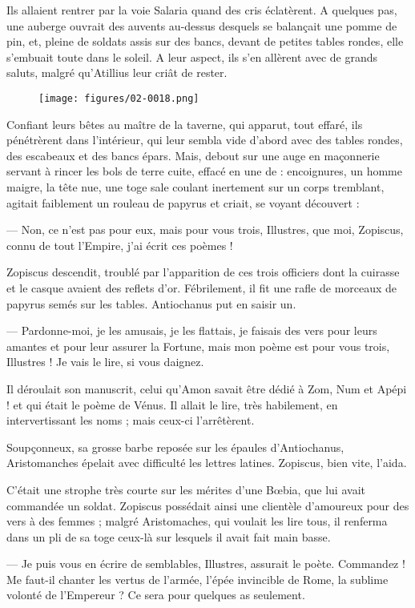 \documentclass[a4paper, 11pt, oneside, polutonikogreek, french]{article}
\begin{document}
Ils allaient rentrer par la voie Salaria quand des cris éclatèrent. A quelques pas, une auberge ouvrait des auvents au-dessus desquels se balançait une pomme de pin, et, pleine de soldats assis sur des bancs, devant de petites tables rondes, elle s'embuait toute dans le soleil. A leur aspect, ils s'en allèrent avec de grands saluts, malgré qu'Atillius leur criât de rester.
\begin{figure}[H]
\centering
\texttt{[image: figures/02-0018.png]}
\end{figure}
Confiant leurs bêtes au maître de la taverne, qui apparut, tout effaré, ils pénétrèrent dans l'intérieur, qui leur sembla vide d'abord avec des tables rondes, des escabeaux et des bancs épars. Mais, debout sur une auge en maçonnerie servant à rincer les bols de terre cuite, effacé en une de : encoignures, un homme maigre, la tête nue, une toge sale coulant inertement sur un corps tremblant, agitait faiblement un rouleau de papyrus et criait, se voyant découvert :

--- Non, ce n'est pas pour eux, mais pour vous trois, Illustres, que moi, Zopiscus, connu de tout l'Empire, j'ai écrit ces poèmes !

Zopiscus descendit, troublé par l'apparition de ces trois officiers dont la cuirasse et le casque avaient des reflets d'or. Fébrilement, il fit une rafle de morceaux de papyrus semés sur les tables. Antiochanus put en saisir un.

--- Pardonne-moi, je les amusais, je les flattais, je faisais des vers pour leurs amantes et pour leur assurer la Fortune, mais mon poème est pour vous trois, Illustres ! Je vais le lire, si vous daignez.

Il déroulait son manuscrit, celui qu'Amon savait être dédié à Zom, Num et Apépi ! et qui était le poème de Vénus. Il allait le lire, très habilement, en intervertissant les noms ; mais ceux-ci l'arrêtèrent.

Soupçonneux, sa grosse barbe reposée sur les épaules d'Antiochanus, Aristomanches épelait avec difficulté les lettres latines. Zopiscus, bien vite, l'aida.

C'était une strophe très courte sur les mérites d'une Bœbia, que lui avait commandée un soldat. Zopiscus possédait ainsi une clientèle d'amoureux pour des vers à des femmes ; malgré Aristomaches, qui voulait les lire tous, il renferma dans un pli de sa toge ceux-là sur lesquels il avait fait main basse.

--- Je puis vous en écrire de semblables, Illustres, assurait le poète. Commandez ! Me faut-il chanter les vertus de l'armée, l'épée invincible de Rome, la sublime volonté de l’Empereur ? Ce sera pour quelques as seulement.
\end{document}
